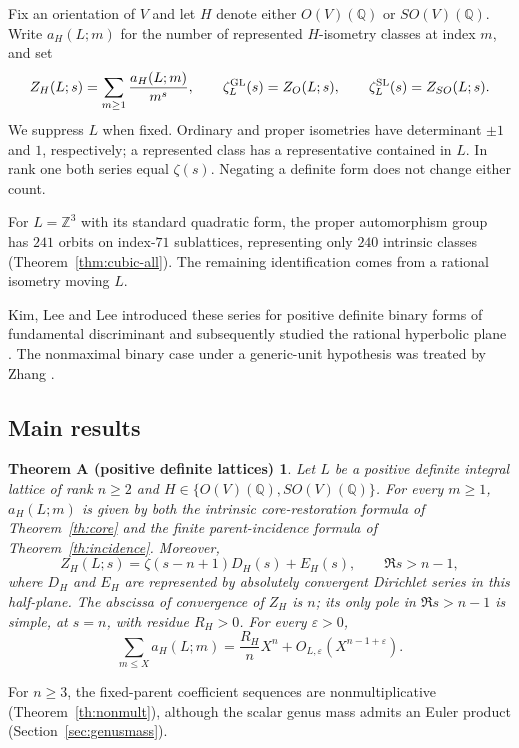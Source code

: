\documentclass[11pt]{article}
\newtheorem*{mainthmA}{Theorem A (positive definite lattices)}
\theoremstyle{remark}\newtheorem{remark}[theorem]{Remark}
\begin{document}
Fix an orientation of $V$ and let $H$ denote either $O(V)(\mathbb Q)$
or $SO(V)(\mathbb Q)$. Write $a_H(L;m)$ for the number of represented
$H$-isometry classes at index $m$, and set
\begin{equation}\label{eq:introdef}
 Z_H(L;s)=\sum_{m\ge1}\frac{a_H(L;m)}{m^s},\qquad
 \zeta_L^{\rm GL}(s)=Z_O(L;s),\qquad
 \zeta_L^{\rm SL}(s)=Z_{SO}(L;s).
\end{equation}
We suppress $L$ when fixed. Ordinary and proper isometries have
determinant $\pm1$ and $1$, respectively; a represented class has a
representative contained in $L$. In rank one both series equal
$\zeta(s)$. Negating a definite form does not change either count.

For $L=\mathbb Z^3$ with its standard quadratic form, the proper
automorphism group has $241$ orbits on index-$71$ sublattices,
representing only $240$ intrinsic classes (Theorem~\ref{thm:cubic-all}).
The remaining identification comes from a rational isometry moving $L$.

Kim, Lee and Lee introduced these series for positive definite
binary forms of fundamental discriminant \cite{KLL} and subsequently
studied the rational hyperbolic plane \cite{Hyperbolic}.
The nonmaximal binary case under a generic-unit hypothesis was treated
by Zhang \cite{Zhang}.
\subsection{Main results}

\begin{mainthmA}
Let $L$ be a positive definite integral lattice of rank $n\ge2$ and
$H\in\{O(V)(\mathbb Q),SO(V)(\mathbb Q)\}$. For every $m\ge1$,
$a_H(L;m)$ is given by both the intrinsic core-restoration formula of
Theorem~\ref{th:core} and the finite parent-incidence formula of
Theorem~\ref{th:incidence}. Moreover,
\[
 Z_H(L;s)=\zeta(s-n+1)D_H(s)+E_H(s),
 \qquad \Re s>n-1,
\]
where $D_H$ and $E_H$ are represented by absolutely convergent Dirichlet
series in this half-plane. The abscissa of convergence of $Z_H$ is $n$;
its only pole in $\Re s>n-1$ is simple, at $s=n$, with residue $R_H>0$.
For every $\varepsilon>0$,
\begin{equation}\label{eq:intropositive}
 \sum_{m\le X}a_H(L;m)
 =\frac{R_H}{n}X^n+O_{L,\varepsilon}(X^{n-1+\varepsilon}).
\end{equation}
\end{mainthmA}

For $n\ge3$, the fixed-parent coefficient sequences are
nonmultiplicative (Theorem~\ref{th:nonmult}), although the scalar
genus mass admits an Euler product (Section~\ref{sec:genusmass}).
\end{document}
